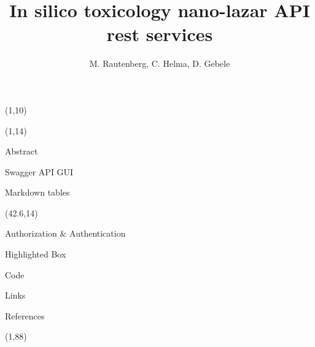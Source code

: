 \documentclass[final]{beamer}
\title{In silico toxicology nano-lazar API rest services}
\author{M. Rautenberg, C. Helma, D. Gebele}
\institute{\emph{in silico} toxicology gmbh, Basel, Switzerland}
\begin{document}
  \begin{frame}{}

    \begin{textblock}{80}(1,10)
        
    \end{textblock}

    \begin{textblock}{40.5}(1,14)
      \begin{block}{Abstract}
        
      \end{block}

      \begin{block}{Swagger API GUI}
        
      \end{block}

      \begin{block}{Markdown tables}
        
      \end{block}

    \end{textblock}

    \begin{textblock}{40.5}(42.6,14)

      \begin{block}{Authorization \& Authentication}
        
      \end{block}

      \begin{alertblock}{Highlighted Box}
        
      \end{alertblock}

      \begin{block}{Code}
        
      \end{block}

      \begin{exampleblock}{Links}
        
      \end{exampleblock}

      \begin{block}{References}
        \small
      \end{block}

    \end{textblock}

    \begin{textblock}{82.1}(1,88)
      
    \end{textblock}

  \end{frame}
\end{document}
